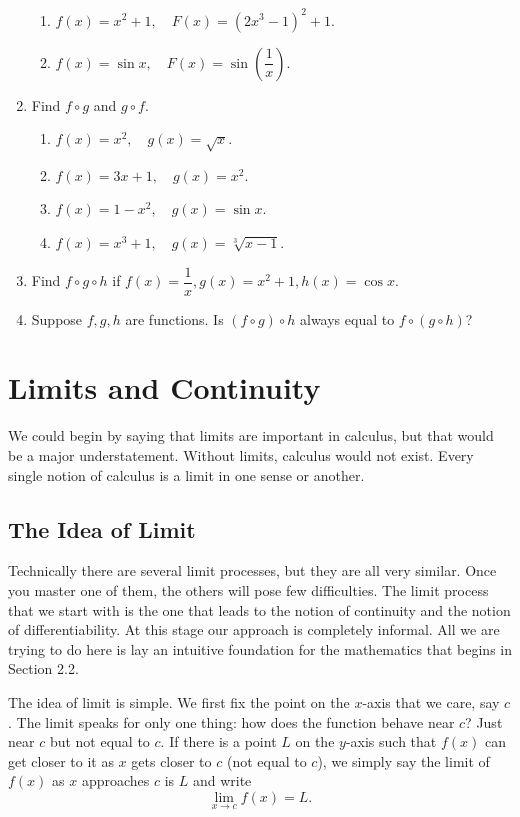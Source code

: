 \documentclass[11pt]{book}
\begin{document}
\begin{enumerate}[label=\arabic*.]
\begin{enumerate}
        \item $f(x)=x^2+1, \quad F(x)=(2x^3-1)^2+1$.
        \item $f(x)=\sin x, \quad F(x)=\sin\left(\dfrac{1}{x}\right)$.
    \end{enumerate}
    \item Find $f\circ g$ and $g\circ f$.
    \begin{enumerate}
        \item $f(x)=x^2, \quad g(x)=\sqrt{x}$.
        \item $f(x)=3x+1, \quad g(x)=x^2$.
        \item $f(x)=1-x^2, \quad g(x)=\sin x$.
        \item $f(x)=x^3+1, \quad g(x)=\sqrt[3]{x-1}$.
    \end{enumerate}
    \item Find $f\circ g\circ h$ if $f(x)=\dfrac{1}{x}, g(x)=x^2+1, h(x)=\cos x$.
    \item Suppose $f, g, h$ are functions. Is $(f\circ g)\circ h$ always equal to $f\circ(g\circ h)$?
\end{enumerate}

\setlength{\delimitershortfall}{13.5pt}

\chapter{Limits and Continuity}

We could begin by saying that limits are important in calculus, but that would be a major understatement. Without limits, calculus would not exist. Every single notion of calculus is a limit in one sense or another.

\section{The Idea of Limit}

Technically there are several limit processes, but they are all very similar. Once you master one of them, the others will pose few difficulties. The limit process that we start with is the one that leads to the notion of continuity and the notion of differentiability. At this stage our approach is completely informal. All we are trying to do here is lay an intuitive foundation for the mathematics that begins in Section 2.2.

The idea of limit is simple. We first fix the point on the $x$-axis that we care, say $c$. The limit speaks for only one thing: how does the function behave near $c$? Just near $c$ but not equal to $c$. If there is a point $L$ on the $y$-axis such that $f(x)$ can get closer to it as $x$ gets closer to $c$ (not equal to $c$), we simply say the limit of $f(x)$ as $x$ approaches $c$ is $L$ and write $$\lim_{x\to c}f(x)=L.$$
\end{document}
